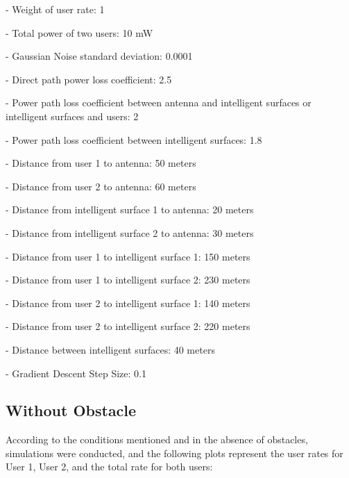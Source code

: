 \documentclass{article}
\begin{document}
- Weight of user rate: 1

- Total power of two users: 10 mW

- Gaussian Noise standard deviation: 0.0001

- Direct path power loss coefficient: 2.5

- Power path loss coefficient between antenna and intelligent surfaces or intelligent surfaces and users: 2

- Power path loss coefficient between intelligent surfaces: 1.8

- Distance from user 1 to antenna: 50 meters

- Distance from user 2 to antenna: 60 meters

- Distance from intelligent surface 1 to antenna: 20 meters

- Distance from intelligent surface 2 to antenna: 30 meters

- Distance from user 1 to intelligent surface 1: 150 meters

- Distance from user 1 to intelligent surface 2: 230 meters

- Distance from user 2 to intelligent surface 1: 140 meters

- Distance from user 2 to intelligent surface 2: 220 meters

- Distance between intelligent surfaces: 40 meters

- Gradient Descent Step Size: 0.1

\subsection{Without Obstacle}
According to the conditions mentioned and in the absence of obstacles, simulations were conducted, and the following plots represent the user rates for User 1, User 2, and the total rate for both users:
\end{document}
